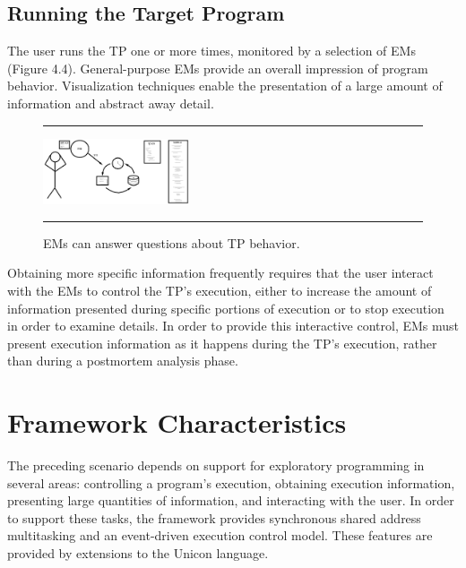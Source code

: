 \subsection*{Running the Target Program}

The user runs the TP one or more times, monitored by a selection of
EMs (Figure 4.4). General-purpose EMs provide an overall impression
of program behavior.  Visualization techniques enable the presentation
of a large amount of information and abstract away detail.

\begin{figure}[tb]
\hrule\bigskip
\centering

\hspace{0.05in}\includegraphics[width=1.7in]{scene3.png}

\caption{EMs can answer questions about TP behavior.}
\medskip\hrule
\vspace{12pt}
\end{figure}

Obtaining more specific information frequently requires that the user
interact with the EMs to control the TP's execution, either to increase
the amount of information presented during specific portions of
execution or to stop execution in order to examine details.
In order to provide this interactive control, EMs must present
execution information as it happens during the TP's execution, rather
than during a postmortem analysis phase.

\section{Framework Characteristics}

The preceding scenario depends on support for exploratory programming
in several areas: controlling a program's execution, obtaining execution
information, presenting large quantities of information,
and interacting with the user.  In order to support these tasks, the
framework provides synchronous shared address multitasking and an
event-driven execution control model.
These features are provided by extensions to the Unicon language.


